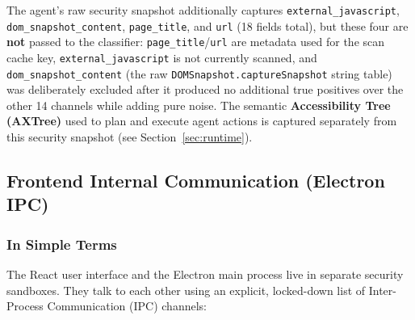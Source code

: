 \documentclass[11pt,a4paper]{article}
\begin{document}
The agent's raw security snapshot additionally captures \texttt{external\_javascript}, \texttt{dom\_snapshot\_content}, \texttt{page\_title}, and \texttt{url} (18 fields total), but these four are \textbf{not} passed to the classifier: \texttt{page\_title}/\texttt{url} are metadata used for the scan cache key, \texttt{external\_javascript} is not currently scanned, and \texttt{dom\_snapshot\_content} (the raw \texttt{DOMSnapshot.captureSnapshot} string table) was deliberately excluded after it produced no additional true positives over the other 14 channels while adding pure noise. The semantic \textbf{Accessibility Tree (AXTree)} used to plan and execute agent actions is captured separately from this security snapshot (see Section~\ref{sec:runtime}).

\subsection{Frontend Internal Communication (Electron IPC)}

\subsubsection*{In Simple Terms}
The React user interface and the Electron main process live in separate security sandboxes. They talk to each other using an explicit, locked-down list of Inter-Process Communication (IPC) channels:
\end{document}
